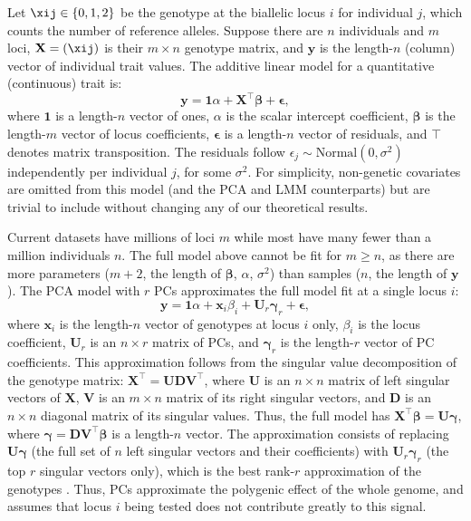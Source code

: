 \documentclass[11pt]{article}
\begin{document}
Let $\xij \in \{ 0, 1, 2 \}$ be the genotype at the biallelic locus $i$ for individual $j$, which counts the number of reference alleles.
Suppose there are $n$ individuals and $m$ loci,
$\mathbf{X} = ( \xij )$ is their $m \times n$ genotype matrix, and
$\mathbf{y}$ is the length-$n$ (column) vector of individual trait values.
The additive linear model for a quantitative (continuous) trait is:
\begin{equation}
  \label{eq:trait}
  \mathbf{y}
  =
  \mathbf{1} \alpha + \mathbf{X}^\intercal \boldsymbol{\beta} + \boldsymbol{\epsilon}
  ,
\end{equation}
where
$\mathbf{1}$ is a length-$n$ vector of ones,
$\alpha$ is the scalar intercept coefficient,
$\boldsymbol{\beta}$ is the length-$m$ vector of locus coefficients,
$\boldsymbol{\epsilon}$ is a length-$n$ vector of residuals,
and $\intercal$ denotes matrix transposition.
The residuals follow $\epsilon_j \sim \text{Normal}(0, \sigma^2)$ independently per individual $j$, for some $\sigma^2$.
For simplicity, non-genetic covariates are omitted from this model (and the PCA and LMM counterparts) but are trivial to include without changing any of our theoretical results.

Current datasets have millions of loci $m$ while most have many fewer than a million individuals $n$.
The full model above cannot be fit for $m \ge n$, as there are more parameters ($m+2$, the length of $\boldsymbol{\beta}$, $\alpha$, $\sigma^2$) than samples ($n$, the length of $\mathbf{y}$).
The PCA model with $r$ PCs approximates the full model fit at a single locus $i$:
\begin{equation}
  \label{eq:pca_gwas}
  \mathbf{y}
  =
  \mathbf{1} \alpha + \mathbf{x}_i \beta_i + \mathbf{U}_r \boldsymbol{\gamma}_r + \boldsymbol{\epsilon}
  ,
\end{equation}
where $\mathbf{x}_i$ is the length-$n$ vector of genotypes at locus $i$ only,
$\beta_i$ is the locus coefficient,
$\mathbf{U}_r$ is an $n \times r$ matrix of PCs, and
$\boldsymbol{\gamma}_r$ is the length-$r$ vector of PC coefficients.
This approximation follows from the singular value decomposition of the genotype matrix:
$\mathbf{X}^\intercal = \mathbf{U} \mathbf{D} \mathbf{V}^\intercal$,
where
$\mathbf{U}$ is an $n \times n$ matrix of left singular vectors of $\mathbf{X}$,
$\mathbf{V}$ is an $m \times n$ matrix of its right singular vectors, and
$\mathbf{D}$ is an $n \times n$ diagonal matrix of its singular values.
Thus, the full model has
$\mathbf{X}^\intercal \boldsymbol{\beta} = \mathbf{U} \boldsymbol{\gamma}$,
where
$\boldsymbol{\gamma} = \mathbf{D} \mathbf{V}^\intercal \boldsymbol{\beta}$ is a length-$n$ vector.
The approximation consists of replacing $\mathbf{U} \boldsymbol{\gamma}$ (the full set of $n$ left singular vectors and their coefficients) with $\mathbf{U}_r \boldsymbol{\gamma}_r$ (the top $r$ singular vectors only), which is the best rank-$r$ approximation of the genotypes \citep{jolliffe_principal_2002}. %
Thus, PCs approximate the polygenic effect of the whole genome, and assumes that locus $i$ being tested does not contribute greatly to this signal.
\end{document}
